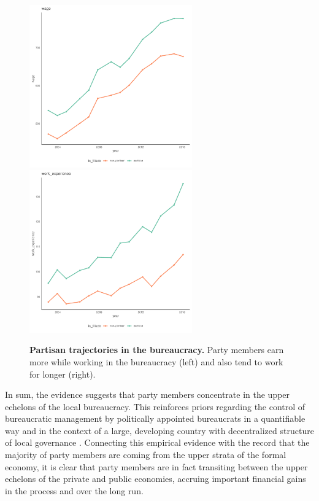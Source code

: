 \documentclass[12pt,a4paper]{article}
\begin{document}
\begin{figure}
    \centering
    \includegraphics[width = 7cm, height = 7cm]{figures/turnover/plot_wage.pdf}
    \includegraphics[width = 7cm, height = 7cm]{figures/turnover/plot_work_experience.pdf}
    \caption{\textbf{Partisan trajectories in the bureaucracy.} Party members earn more while working in the bureaucracy (left) and also tend to work for longer (right).}
    \label{fig:partisan_trajectory}
\end{figure}

In sum, the evidence suggests that party members concentrate in the upper echelons of the local bureaucracy. This reinforces priors regarding the control of bureaucratic management by politically appointed bureaucrats in a quantifiable way and in the context of a large, developing country with decentralized structure of local governance \citep{lewis2010politics}. Connecting this empirical evidence with the record that the majority of party members are coming from the upper strata of the formal economy, it is clear that party members are in fact transiting between the upper echelons of the private and public economies, accruing important financial gains in the process and over the long run.
\end{document}
